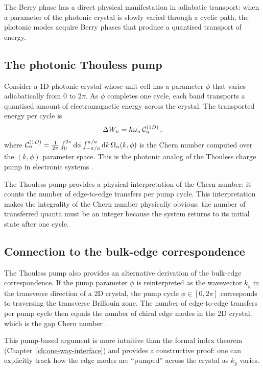 The Berry phase has a direct physical manifestation in adiabatic
transport: when a parameter of the photonic crystal is slowly varied
through a cyclic path, the photonic modes acquire Berry phases that
produce a quantised transport of energy.

\subsection{The photonic Thouless pump}
\label{sec:ch5-thouless-pump}

Consider a 1D photonic crystal whose unit cell has a parameter
$\phi$ that varies adiabatically from $0$ to $2\pi$.  As $\phi$
completes one cycle, each band transports a quantised amount of
electromagnetic energy across the crystal.  The transported energy
per cycle is
\begin{equation}\label{eq:ch5-thouless-pump}
  \Delta W_n = \hbar\omega_n\,\mathcal{C}_n^{(1D)}\,,
\end{equation}
where $\mathcal{C}_n^{(1D)}=\frac{1}{2\pi}\int_0^{2\pi}\mathrm{d}\phi
\int_{-\pi/a}^{\pi/a}\mathrm{d} k\,\Omega_n(k,\phi)$ is the Chern number
computed over the $(k,\phi)$ parameter space.  This is the photonic
analog of the Thouless charge pump in electronic systems
\cite{thouless1982quantized,asbth2016berry}.

The Thouless pump provides a physical interpretation of the Chern
number: it counts the number of edge-to-edge transfers per pump
cycle.  This interpretation makes the integrality of the Chern
number physically obvious: the number of transferred quanta must be
an integer because the system returns to its initial state after
one cycle.

\subsection{Connection to the bulk-edge correspondence}
\label{sec:ch5-pump-bec}

The Thouless pump also provides an alternative derivation of the
bulk-edge correspondence.  If the pump parameter $\phi$ is
reinterpreted as the wavevector $k_y$ in the transverse direction of
a 2D crystal, the pump cycle $\phi\in[0,2\pi]$ corresponds to
traversing the transverse Brillouin zone.  The number of edge-to-edge
transfers per pump cycle then equals the number of chiral edge modes
in the 2D crystal, which is the gap Chern number
\cite{ozawa2018topological,silveirinha2016bulk}.

This pump-based argument is more intuitive than the formal index
theorem (Chapter~\ref{ch:one-way-interface}) and provides a
constructive proof: one can explicitly track how the edge modes are
``pumped'' across the crystal as $k_y$ varies.

